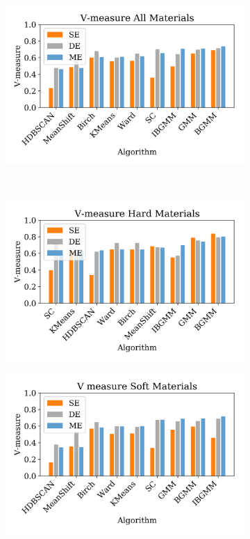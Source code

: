 \documentclass[a4paper,11pt]{article}
\begin{document}
\begin{figure}[t!]
    \centering
    \begin{subfigure}[b]{0.32\textwidth}
        \includegraphics[width=\textwidth]{figures/energy_comparison.png}
    \end{subfigure}
    ~ %
    \begin{subfigure}[b]{0.32\textwidth}
        \includegraphics[width=\textwidth]{figures/hard.png}
    \end{subfigure}
    \begin{subfigure}[b]{0.32\textwidth}
        \includegraphics[width=\textwidth]{figures/soft.png}

\end{subfigure}
\end{figure}
\end{document}
